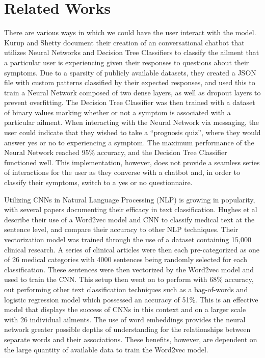 \documentclass[12pt]{report}
\begin{document}
\chapter{Related Works}
  There are various ways in which we could have the user interact with the
  model. Kurup and Shetty document their creation of an conversational chatbot
  that utilizes Neural Networks and Decision Tree Classifiers to classify the
  ailment that a particular user is experiencing given their responses to
  questions about their symptoms. Due to a sparsity of publicly available
  datasets, they created a JSON file with custom patterns classified by their
  expected responses, and used this to train a Neural Network composed of two
  dense layers, as well as dropout layers to prevent overfitting. The Decision
  Tree Classifier was then trained with a dataset of binary values marking
  whether or not a symptom is associated with a particular ailment. When
  interacting with the Neural Network via messaging, the user could indicate
  that they wished to take a “prognosis quiz”, where they would answer yes or
  no to experiencing a symptom. The maximum performance of the Neural Network
  reached 95\% accuracy, and the Decision Tree Classifier functioned well. This
  implementation, however, does not provide a seamless series of interactions
  for the user as they converse with a chatbot and, in order to classify their
  symptoms, switch to a yes or no questionnaire.

Utilizing CNNs in Natural Language Processing (NLP) is growing in popularity,
with several papers documenting their efficacy in text classification. Hughes
et al describe their use of a Word2vec model and CNN to classify medical text
at the sentence level, and compare their accuracy to other NLP techniques.
Their vectorization model was trained through the use of a dataset containing
15,000 clinical research. A series of clinical articles were then each
pre-categorized as one of 26 medical categories with 4000 sentences being
randomly selected for each classification. These sentences were then vectorized
by the Word2vec model and used to train the CNN. This setup then went on to
perform with 68\% accuracy, out performing other text classification techniques
such as a bag-of-words and logistic regression model which possessed an
accuracy of 51\%. This is an effective model that displays the success of CNNs
in this context and on a larger scale with 26 individual ailments. The use of
word embeddings provides the neural network greater possible depths of
understanding for the relationships between separate words and their
associations. These benefits, however, are dependent on the large quantity of
available data to train the Word2vec model.
\end{document}

